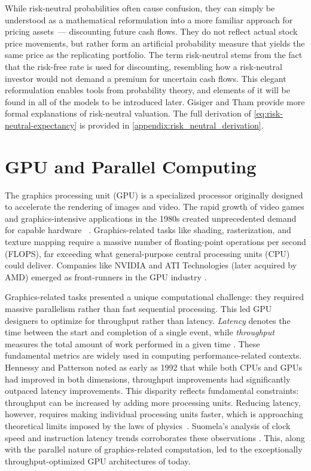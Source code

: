 \documentclass[english,12pt,a4paper,pdftex,sci,utf8]{aaltothesis}
\begin{document}
\noindent While risk-neutral probabilities often cause confusion, they can simply be understood as a mathematical reformulation into a more familiar approach for pricing assets~--- discounting future cash flows. They do not reflect actual stock price movements, but rather form an artificial probability measure that yields the same price as the replicating portfolio. The term risk-neutral stems from the fact that the risk-free rate is used for discounting, resembling how a risk-neutral investor would not demand a premium for uncertain cash flows. This elegant reformulation enables tools from probability theory, and elements of it will be found in all of the models to be introduced later. Gisiger \cite{gisiger2010risk} and Tham \cite{tham2001risk} provide more formal explanations of risk-neutral valuation. The full derivation of \cref{eq:risk-neutral-expectancy} is provided in \cref{appendix:risk_neutral_derivation}.

\clearpage

\section{GPU and Parallel Computing}\label{sec:gpu}

The graphics processing unit (GPU) is a specialized processor originally designed to accelerate the rendering of images and video. The rapid growth of video games and graphics-intensive applications in the 1980s created unprecedented demand for capable hardware ~\cite{sanders2010cuda, kirk2016programming}. Graphics-related tasks like shading, rasterization, and texture mapping require a massive number of floating-point operations per second (FLOPS), far exceeding what general-purpose central processing units (CPU) could deliver. Companies like NVIDIA and ATI Technologies (later acquired by AMD) emerged as front-runners in the GPU industry \cite{sanders2010cuda}.

Graphics-related tasks presented a unique computational challenge: they required massive parallelism rather than fast sequential processing. This led GPU designers to optimize for throughput rather than latency. \emph{Latency} denotes the time between the start and completion of a single event, while \emph{throughput} measures the total amount of work performed in a given time \cite{hennessy2011computer}. These fundamental metrics are widely used in computing performance-related contexts. Hennessy and Patterson \cite{hennessy2011computer} noted as early as 1992 that while both CPUs and GPUs had improved in both dimensions, throughput improvements had significantly outpaced latency improvements. This disparity reflects fundamental constraints: throughput can be increased by adding more processing units. Reducing latency, however, requires making individual processing units faster, which is approaching theoretical limits imposed by the laws of physics~\cite{hennessy2011computer, sanders2010cuda}. Suomela's analysis of clock speed and instruction latency trends corroborates these observations \cite{suomela_ppc}. This, along with the parallel nature of graphics-related computation, led to the exceptionally throughput-optimized GPU architectures of today.
\end{document}
